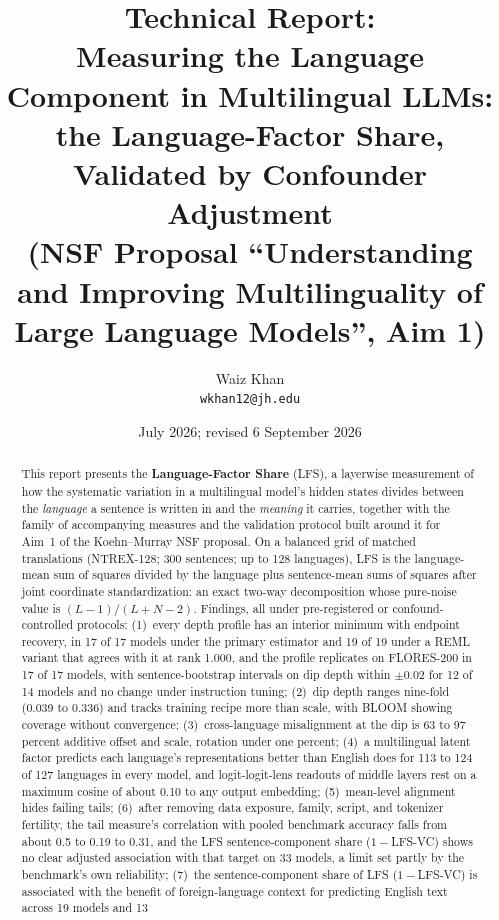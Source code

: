\documentclass[11pt,a4paper]{article}
\title{\textbf{Technical Report:} \\ \large Measuring the Language Component in Multilingual
LLMs: \\ the Language-Factor Share, Validated by Confounder Adjustment \\
\vspace{2mm} \normalsize (NSF Proposal ``Understanding and Improving Multilinguality of Large Language Models'', Aim 1)}
\author{Waiz Khan \\ \texttt{wkhan12@jh.edu}}
\date{July 2026; revised 6 September 2026}
\begin{document}
\maketitle

\begin{abstract}
This report presents the \textbf{Language-Factor Share} (LFS), a layerwise
measurement of how the systematic variation in a multilingual model's hidden
states divides between the \emph{language} a sentence is written in and the
\emph{meaning} it carries, together with the family of accompanying measures and
the validation protocol built around it for Aim~1 of the Koehn--Murray NSF
proposal. On a balanced grid of matched translations (NTREX-128; 300
sentences; up to 128 languages), LFS is the language-mean sum of squares
divided by the language plus sentence-mean sums of squares after joint
coordinate standardization: an exact two-way decomposition whose pure-noise
value is $(L-1)/(L+N-2)$. Findings, all under pre-registered or
confound-controlled protocols: (1)~every depth profile has an interior
minimum with endpoint recovery, in 17 of 17 models under the primary
estimator and 19 of 19 under a REML variant that agrees with it at rank
1.000, and the profile replicates on FLORES-200 in 17 of 17 models, with
sentence-bootstrap intervals on dip depth within $\pm 0.02$ for 12 of 14
models and no change under instruction tuning; (2)~dip depth ranges nine-fold (0.039 to 0.336) and tracks training
recipe more than scale, with BLOOM showing coverage without convergence;
(3)~cross-language misalignment at the dip is 63 to 97 percent additive
offset and scale, rotation under one percent; (4)~a multilingual latent
factor predicts each language's representations better than English does for
113 to 124 of 127 languages in every model, and logit-logit-lens readouts of middle
layers rest on a maximum cosine of about 0.10 to any output embedding;
(5)~mean-level alignment hides failing tails; (6)~after removing data
exposure, family, script, and tokenizer fertility, the tail measure's
correlation with pooled benchmark accuracy falls from about 0.5 to 0.19 to 0.31,
and the LFS sentence-component share ($1-$LFS-VC) shows no clear adjusted association with that target on 33 models, a
limit set partly by the benchmark's own reliability; (7)~the sentence-component share of LFS ($1-$LFS-VC) is associated with
the benefit of foreign-language context for predicting English text across 19 models and 13

\end{abstract}
\end{document}
